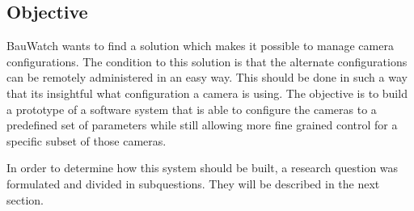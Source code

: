% 

\subsection{Objective}
BauWatch wants to find a solution which makes it possible to manage camera configurations.
The condition to this solution is that the alternate configurations can be remotely administered in an easy way.
This should be done in such a way that its insightful what configuration a camera is using.
The objective is to build a prototype of a software system that is able to configure the cameras to a predefined set of parameters while still allowing
more fine grained control for a specific subset of those cameras.

In order to determine how this system should be built, a research question was formulated and divided in subquestions. They will be described in the next section.



